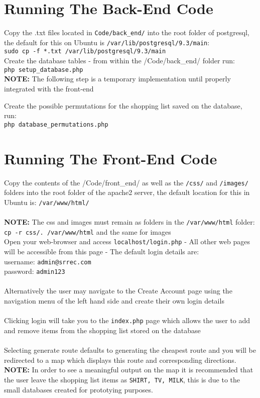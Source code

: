 \documentclass[10pt, a4paper, onecolumn]{scrartcl}
\begin{document}
	\section{Running The Back-End Code}
	
	Copy the .txt files located in \texttt{Code/back\_end/} into the root
	folder of postgresql, the default for this on Ubuntu is
	\texttt{/var/lib/postgresql/9.3/main}: \\
	\texttt{sudo\ cp\ -f\ *.txt\ /var/lib/postgresql/9.3/main}\\
	
	Create the database tables - from within the /Code/back\_end/ folder
	run:\\ \texttt{php\ setup\_database.php} \\
	
	\textbf{NOTE:} The following step is a temporary implementation until
	properly integrated with the front-end
	
	Create the possible permutations for the shopping list saved on the
	database, run: \\ \texttt{php\ database\_permutations.php}
	
	\section{Running The Front-End Code}
	
	Copy the contents of the /Code/front\_end/ as well as the \texttt{/css/}
	and \texttt{/images/} folders into the root folder of the apache2
	server, the default location for this in Ubuntu is:
	\texttt{/var/www/html/}\\ \\ \textbf{NOTE:} The css and images must remain
	as folders in the \texttt{/var/www/html} folder: \\
	\texttt{cp\ -r\ css/.\ /var/www/html} and the same for images \\
	
	Open your web-browser and access \texttt{localhost/login.php} - All
	other web pages will be accessible from this page - The default login
	details are: \\ username: \texttt{admin@srrec.com} \\ password:
	\texttt{admin123} \\ \\ Alternatively the user may navigate to the Create
	Account page using the navigation menu of the left hand side and create
	their own login details \\ \\ Clicking login will take you to the
	\texttt{index.php} page which allows the user to add and remove items
	from the shopping list stored on the database \\ \\ Selecting generate route
	defaults to generating the cheapest route and you will be redirected to
	a map which displays this route and corresponding directions.\\
	
	\textbf{NOTE:} In order to see a meaningful output on the map it is
	recommended that the user leave the shopping list items as
	\texttt{SHIRT,\ TV,\ MILK}, this is due to the small databases created
	for prototying purposes.

	

	
\end{document}
